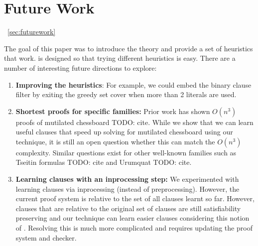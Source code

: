 \section{Future Work}~\ref{sec:futurework}

The goal of this paper was to introduce the theory and provide a set of
heuristics that work. \tool is designed so that trying different heuristics
is easy. There are a number of interesting future directions to explore:

\begin{enumerate}
    \item \textbf{Improving the heuristics}: For example, we could embed the
    binary clause filter by exiting the greedy set cover when more than 2
    literals are used.
    \item \textbf{Shortest proofs for specific families:} Prior work has shown
    $O(n^3)$ \pr proofs of mutilated chessboard TODO: cite.  While we show that
    we can learn useful clauses that speed up solving for mutilated chessboard
    using our technique, it is still an open question whether this can match the
    $O(n^3)$ complexity. Similar questions exist for other well-known families
    such as Tseitin formulas TODO: cite and Urumquat TODO: cite.
    \item \textbf{Learning \pr clauses with an inprocessing step:} We
    experimented with learning \pr clauses via inprocessing (instead of
    preprocessing). However, the current \pr proof system is \pr relative to the
    set of all clauses learnt so far. However, clauses that are \pr relative to
    the original set of clauses are still satisfiability preserving and our
    technique can learn easier clauses considering this notion of \pr. Resolving
    this is much more complicated and requires updating the \pr proof system and
    checker.
\end{enumerate}